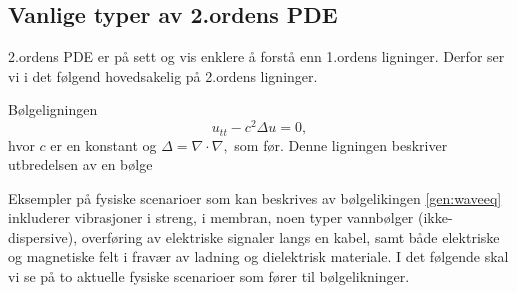 \subsection{Vanlige typer av 2.ordens PDE}
2.ordens PDE er på sett og vis enklere å forstå enn 1.ordens ligninger. Derfor ser vi i det følgend hovedsakelig på 2.ordens ligninger.
\begin{eks}{Bølgeligningen}
\begin{equation}\label{gen:waveeq}
u_{tt} - c^2 \Delta u = 0,
\end{equation}
hvor \( c \) er en konstant og $\Delta=\nabla\cdot\nabla,$ som før. Denne ligningen beskriver utbredelsen av en bølge 
\end{eks}
Eksempler på fysiske scenarioer som kan beskrives av bølgelikingen \eqref{gen:waveeq} inkluderer vibrasjoner i streng, i membran, noen typer vannbølger (ikke-dispersive), overføring av elektriske signaler langs en kabel, samt både elektriske og magnetiske felt i fravær av ladning og dielektrisk materiale. I det følgende skal vi se på to aktuelle fysiske scenarioer som fører til bølgelikninger.

